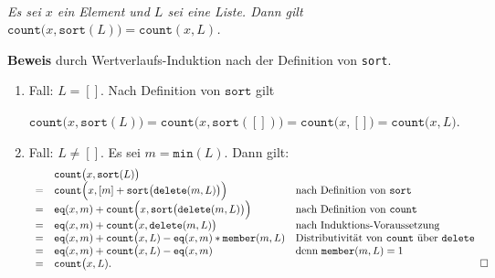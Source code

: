 \begin{Satz} \hspace*{\fill} \\[0.1cm]
{\em
  Es sei $x$ ein Element und $L$ sei eine Liste.  Dann gilt \\[0.1cm]
  \hspace*{1.3cm} $\mathtt{count}\bigl(x, \mathtt{sort}(L)\bigr) = \mathtt{count}(x, L)$.
}
\end{Satz}

\noindent
\textbf{Beweis} durch Wertverlaufs-Induktion nach der Definition von \texttt{sort}.
\begin{enumerate}
\item Fall: $L=[]$.  Nach Definition von $\mathtt{sort}$ gilt 

     \hspace*{1.3cm} 
     $\mathtt{count}\bigl(x, \mathtt{sort}(L)\bigr) = \mathtt{count}\bigl(x, \mathtt{sort}([])\bigr) = \mathtt{count}\bigl(x,[]\bigr) = \mathtt{count}\bigl(x,L\bigr)$.
\item Fall: $L \not= []$.  Es sei $m = \mathtt{min}(L)$. Dann gilt:
     \[ 
     \begin{array}[b]{cll}
        & \mathtt{count}\bigl(x, \mathtt{sort}(L)\bigr) \\
      = & \mathtt{count}\Bigl(x, [m] + \mathtt{sort}\bigl(\mathtt{delete}(m,L)\bigr)\Bigr) &
         \mbox{nach Definition von \texttt{sort}} \\
      = & \mathtt{eq}(x,m) + \mathtt{count}\Bigl(x, \mathtt{sort}\bigl(\mathtt{delete}(m,L)\bigr)\Bigr) &
         \mbox{nach Definition von \texttt{count}} \\
      = & \mathtt{eq}(x,m) + \mathtt{count}\bigl(x, \mathtt{delete}(m,L)\bigr) &
         \mbox{nach Induktions-Voraussetzung} \\
      = & \mathtt{eq}(x,m) + \mathtt{count}\bigl(x, L) - \mathtt{eq}(x,m)*\mathtt{member}(m,L) &
         \mbox{Distributivit\"at von \texttt{count} \"uber \texttt{delete}} \\
      = & \mathtt{eq}(x,m) + \mathtt{count}\bigl(x, L) - \mathtt{eq}(x,m) &
         \mbox{denn $\mathtt{member}(m,L) = 1$} \\
      = & \mathtt{count}\bigl(x, L).
     \end{array}\hspace*{\fill} \Box
     \]
\end{enumerate}

